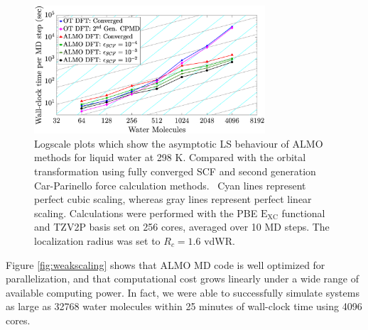 \documentclass[aps,prl,reprint,amsmath,amssymb]{revtex4-1}
\begin{document}
\begin{figure}
\includegraphics[trim={2.5cm 0.5cm 3.4cm 0.1cm},clip,width=8.6cm]{strongscaling_log.eps}
\caption{\label{fig:strongscaling_log} Logscale plots which show the asymptotic LS behaviour of ALMO methods for liquid water at 298 K.
Compared with the orbital transformation using fully converged SCF and second generation Car-Parinello force calculation methods.~\cite{a:ot,a:ot2,a:2ndcpmd}
Cyan lines represent perfect cubic scaling, whereas gray lines represent perfect linear scaling. 
Calculations were performed with the PBE $\mathrm{E_{XC}}$ functional and TZV2P basis set on 256 cores, averaged over 10 MD steps. 
The localization radius was set to $R_{c} = 1.6$ vdWR.}
\end{figure}

Figure \ref{fig:weakscaling} shows that ALMO MD code is well optimized for parallelization, and that computational cost grows linearly under a wide range of available computing power. 
In fact, we were able to successfully simulate systems as large as 32768 water molecules within 25 minutes of wall-clock time using 4096 cores.

\end{document}
